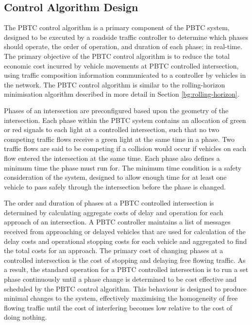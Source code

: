 \subsection {Control Algorithm Design}
\label{sec:PBTCDesign}

The PBTC control algorithm is a primary component of the PBTC system, designed to be executed by a roadside traffic controller to determine which phases should operate, the order of operation, and duration of each phase; in real-time. The primary objective of the PBTC control algorithm is to reduce the total economic cost incurred by vehicle movements  at PBTC controlled intersection, using traffic composition information communicated to a controller by vehicles in the network. The PBTC control algorithm is similar to the rolling-horizon minimisation algorithm described in more detail in Section \ref{bg:rolling-horizon}.

Phases of an intersection are preconfigured based upon the geometry of the intersection. Each phase within the PBTC system contains an allocation of green or red signals to each light at a controlled intersection, such that no two competing traffic flows receive a green light at the same time in a phase. Two traffic flows are said to be competing if a collision would occur if vehicles on each flow entered the intersection at the same time. Each phase also defines a minimum time the phase must run for.  The minimum time condition is a safety consideration of the system, designed to allow enough time for at least one vehicle to pass safely through the intersection before the phase is changed. 

The order and duration of phases at a PBTC controlled intersection is determined by calculating aggregate costs of delay and operation for each approach of an intersection. A PBTC controller maintains a list of messages received from approaching or delayed vehicles that are used for calculation of the delay costs and operational stopping costs for each vehicle and aggregated to find the total costs for an approach. The primary cost of changing phases at a controlled intersection is the cost of stopping and delaying free flowing traffic. As a result, the standard operation for a PBTC controlled intersection is to run a set phase continuously until a phase change is determined to be cost effective and scheduled by the PBTC control algorithm. This behaviour is designed to produce minimal changes to the system, effectively maximising the homogeneity of free flowing traffic until the cost of interfering becomes low relative to the cost of doing nothing. 

